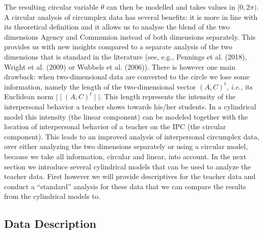 \documentclass[man,mask]{apa6}
\begin{document}
The resulting circular variable \(\theta\) can then be modelled and takes values
in \([0, 2\pi)\).\newline
\indent A circular analysis of circumplex data has several benefits: it is more
in line with its theoretical definition and it allows us to analyse the blend of
the two dimensions Agency and Communion instead of both dimensions separately.
This provides us with new insights compared to a separate analysis of the two
dimensions that is standard in the literature (see, e.g.,
Pennings et al. (2018), Wright et al. (2009) or
Wubbels et al. (2006)). There is however one main drawback: when
two-dimensional data are converted to the circle we lose some information,
namely the length of the two-dimensional vector \((A, C)^t\), \emph{i.e.}, its
Euclidean norm \(\mid\mid (A, C)^t \mid\mid\). This length represents the
intensity of the interpersonal behavior a teacher shows towards his/her
students. In a cylindrical model this intensity (the linear component) can be
modeled together with the location of interpersonal behavior of a teacher on the
IPC (the circular component). This leads to an improved analysis of interpersonal
circumplex data, over either analyzing the two dimensions separately or using a
circular model, because we take all information, circular and linear, into
account. In the next section we introduce several cylindrical models that can be
used to analyze the teacher data. First however we will provide descriptives for
the teacher data and conduct a \enquote{standard} analysis for these data that we can compare the results from the cylindrical models to.

\subsection{Data Description}\label{DataDescriptives}
\end{document}

